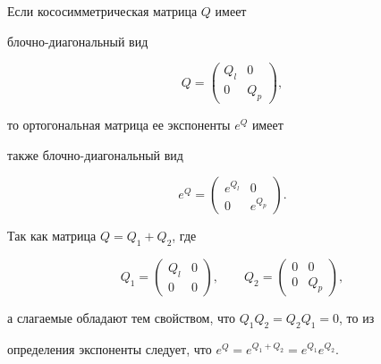 \begin{lems} Если кососимметрическая матрица $Q$ имеет


блочно-диагональный вид


\begin{equation}


Q=


\begin{pmatrix}


Q_l & 0 \\


0 & Q_p


\end{pmatrix}


,


\end{equation}


то ортогональная матрица ее экспоненты $e^Q$ имеет


также блочно-диагональный вид


\begin{equation}


e^Q =


\begin{pmatrix}


e^{Q_l} & 0\\


0 & e^{Q_p}


\end{pmatrix}


.


\end{equation}


\end{lems}





\begin{pf} Так как матрица $Q=Q_1+Q_2$, где


$$


Q_1=


\begin{pmatrix}


Q_l & 0 \\


0 & 0


\end{pmatrix}


,\qquad


Q_2=


\begin{pmatrix}


0 & 0\\


0 & Q_p


\end{pmatrix}


,


$$


а слагаемые обладают тем свойством, что $Q_1 Q_2=Q_2 Q_1=0$, то из


определения экспоненты следует, что $e^Q=e^{Q_1+Q_2}=e^{Q_1}e^{Q_2}$.


\end{pf}





